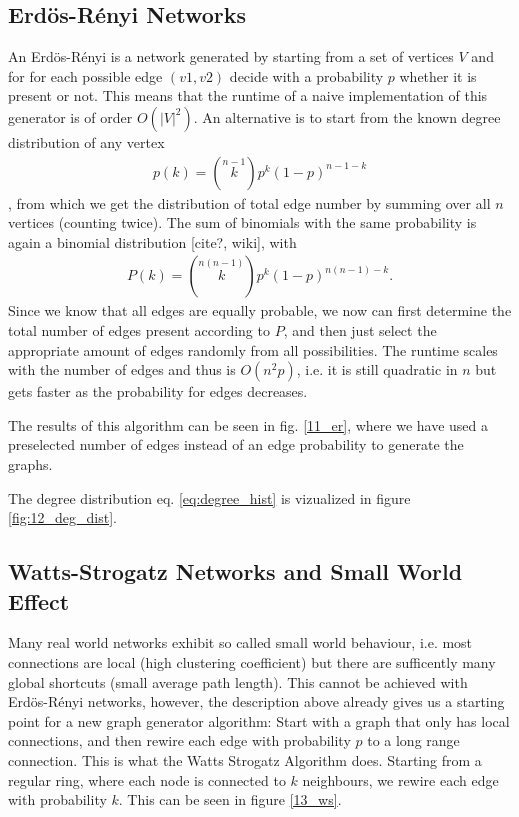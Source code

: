 \documentclass{scrartcl}
\begin{document}
\subsection{Erdös-Rényi Networks}
An Erdös-Rényi is a network generated by starting from a set of vertices $V$ and for for each possible edge $(v1, v2)$ decide with a probability $p$ whether it is present or not. This means that the runtime of a naive implementation of this generator is of order $O(|V|^2)$. An alternative is to start from the known degree distribution of any vertex 
\begin{align}
p(k) = \left( \stackrel{n-1}{k} \right) p^k (1-p)^{n-1-k} \label{eq:degree_hist}
\end{align}, from which we get the distribution of total edge number by summing over all $n$ vertices (counting twice). The sum of binomials with the same probability is again a binomial distribution [cite?, wiki], with
\begin{align}
P(k) = \left( \stackrel{n(n-1) }{k} \right) p^k (1-p)^{n(n-1)-k}.
\end{align}
Since we know that all edges are equally probable, we now can first determine the total number of edges present according to $P$, and then just select the appropriate amount of edges randomly from all possibilities. The runtime scales with the number of edges and thus is $O(n^2 p)$, i.e. it is still quadratic in $n$ but gets faster as the probability for edges decreases.

The results of this algorithm can be seen in fig. \ref{11_er}, where we have used a preselected number of edges instead of an edge probability to generate the graphs.

The degree distribution eq. \eqref{eq:degree_hist} is vizualized in figure \ref{fig:12_deg_dist}.

\subsection{Watts-Strogatz Networks and Small World Effect}
Many real world networks exhibit so called small world behaviour, i.e. most connections are local (high clustering coefficient) but there are sufficently many global shortcuts (small average path length). This cannot be achieved with Erdös-Rényi networks, however, the description above already gives us a starting point for a new graph generator algorithm: Start with a graph that only has local connections, and then rewire each edge with probability $p$ to a long range connection. This is what the Watts Strogatz Algorithm does. Starting from a regular ring, where each node is connected to $k$ neighbours, we rewire each edge with probability $k$. This can be seen in figure \ref{13_ws}.
\end{document}
